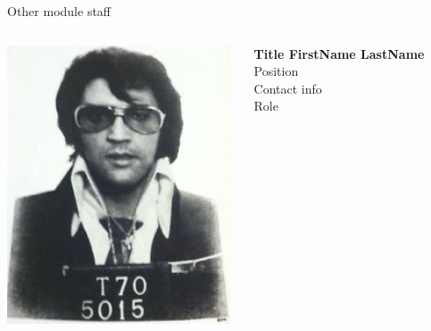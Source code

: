 \begin{frame}{Other module staff}
\begin{columns}
  \begin{column}{0.20\textwidth}
   \begin{center}
     \includegraphics[width=0.98\textwidth]{./images/people/placeholder_m}\\
   \end{center}
  \end{column}
  \begin{column}{0.80\textwidth}
    {\bf Title FirstName LastName} \\
    Position\\
    Contact info\\
    Role\\
  \end{column}
\end{columns}

\end{frame}
